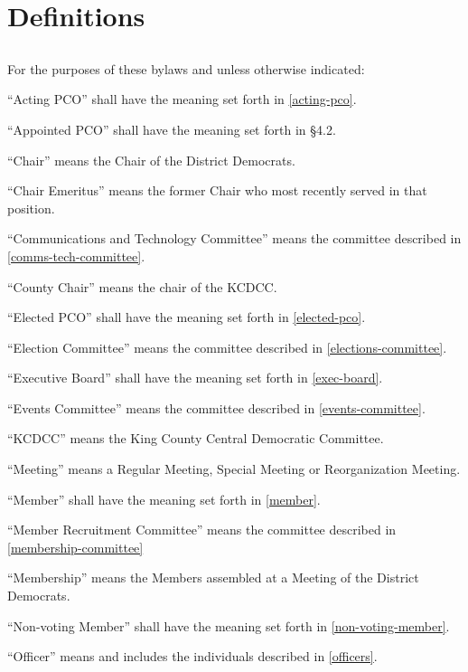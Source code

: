 \section{Definitions} \label{defs}
\subsection{}
For the purposes of these bylaws and unless otherwise indicated:
\begin{alphalist}
    \item “Acting PCO” shall have the meaning set forth in \autoref{acting-pco}.
    \item “Appointed PCO” shall have the meaning set forth in \S 4.2.
    \item “Chair” means the Chair of the \fortythird{} District Democrats.
    \item “Chair Emeritus” means the former Chair who most recently served in that position.
    \item “Communications and Technology Committee” means the committee described in \autoref{comms-tech-committee}.
    \item “County Chair” means the chair of the KCDCC.
    \item “Elected PCO” shall have the meaning set forth in \autoref{elected-pco}.
    \item “Election Committee” means the committee described in \autoref{elections-committee}.
    \item “Executive Board” shall have the meaning set forth in \autoref{exec-board}.
    \item “Events Committee” means the committee described in \autoref{events-committee}.
    \item “KCDCC” means the King County Central Democratic Committee.
    \item “Meeting” means a Regular Meeting, Special Meeting or Reorganization Meeting.
    \item “Member” shall have the meaning set forth in \autoref{member}.
    \item “Member Recruitment Committee” means the committee described in \autoref{membership-committee}
    \item “Membership” means the Members assembled at a Meeting of the \fortythird{} District Democrats.
    \item “Non-voting Member” shall have the meaning set forth in \autoref{non-voting-member}.
    \item “Officer” means and includes the individuals described in \autoref{officers}.

\end{alphalist}
